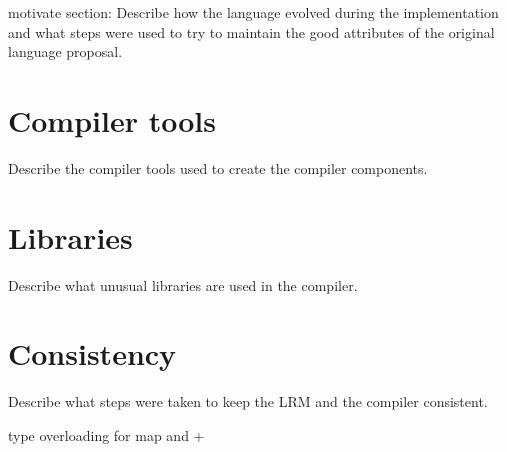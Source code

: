 motivate section:
Describe how the language evolved during the implementation and what steps
were used to try to maintain the good attributes of the original language proposal.

\section{Compiler tools}
Describe the compiler tools used to create the compiler components.

\section{Libraries}
Describe what unusual libraries are used in the compiler.

\section{Consistency}
Describe what steps were taken to keep the LRM and the compiler consistent.



type overloading for map and +

